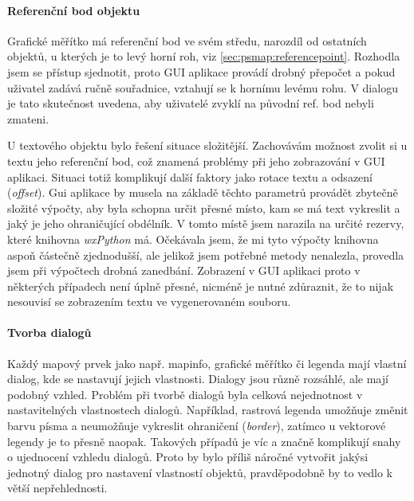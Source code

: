 \documentclass[a4paper,12pt,draft]{article}
\begin{document}
 \paragraph*{Referenční bod objektu} 
 Grafické měřítko má referenční bod ve svém středu, narozdíl od ostatních objektů, u kterých je to levý horní roh, viz \ref{sec:psmap:referencepoint}. Rozhodla jsem se přístup sjednotit, proto GUI aplikace provádí drobný přepočet a pokud uživatel zadává ručně souřadnice, vztahují se k hornímu levému rohu. V dialogu je tato skutečnost uvedena, aby uživatelé zvyklí na původní ref. bod nebyli zmateni.
 
 U textového objektu bylo řešení situace složitější. Zachovávám možnost zvolit si u textu jeho referenční bod, což znamená problémy při jeho zobrazování v GUI aplikaci. Situaci totiž komplikují další faktory jako rotace textu a odsazení (\emph{offset}).
 Gui aplikace by musela na základě těchto parametrů provádět zbytečně složité výpočty, aby byla schopna určit přesné místo, kam se má text vykreslit a jaký je jeho ohraničující obdélník. V tomto místě jsem narazila na určité rezervy, které knihovna \emph{wxPython} má. Očekávala jsem, že mi tyto výpočty knihovna aspoň částečně zjednodušší, ale jelikož jsem potřebné metody nenalezla, provedla jsem při výpočtech drobná zanedbání. Zobrazení v GUI aplikaci proto v některých případech není úplně přesné, nicméně je nutné zdůraznit, že to nijak nesouvisí se zobrazením textu ve  vygenerovaném souboru.
 
 \paragraph*{Tvorba dialogů}
 Každý mapový prvek jako např. mapinfo, grafické měřítko či legenda mají vlastní dialog, kde se nastavují jejich vlastnosti. Dialogy jsou různě rozsáhlé, ale mají podobný vzhled. Problém při tvorbě dialogů byla celková nejednotnost v nastavitelných vlastnostech dialogů. Například, rastrová legenda umožňuje změnit barvu písma a neumožňuje vykreslit ohraničení (\emph{border}), zatímco u vektorové legendy je to přesně naopak. Takových případů je víc a značně komplikují snahy o ujednocení vzhledu dialogů. Proto by bylo příliš náročné vytvořit jakýsi jednotný dialog pro nastavení vlastností objektů, pravděpodobně by to vedlo k větší nepřehlednosti. 
 
\end{document}
